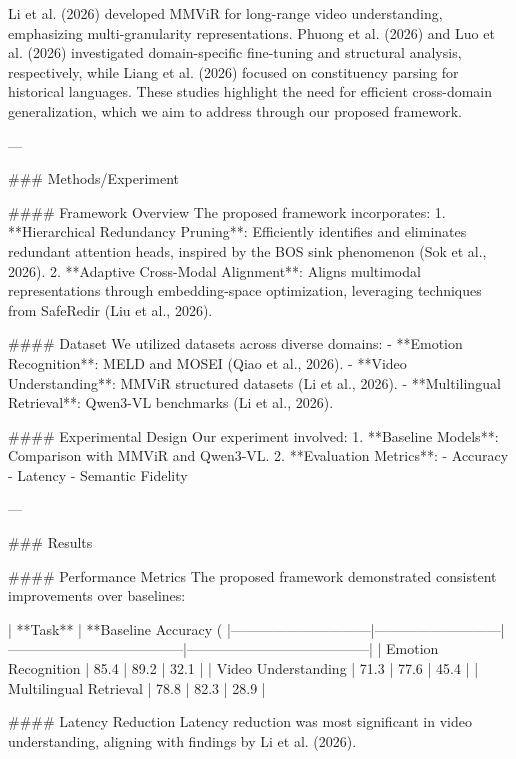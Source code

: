 Li et al. (2026) developed MMViR for long-range video understanding, emphasizing multi-granularity representations. Phuong et al. (2026) and Luo et al. (2026) investigated domain-specific fine-tuning and structural analysis, respectively, while Liang et al. (2026) focused on constituency parsing for historical languages. These studies highlight the need for efficient cross-domain generalization, which we aim to address through our proposed framework.

---

### Methods/Experiment

#### Framework Overview
The proposed framework incorporates:
1. **Hierarchical Redundancy Pruning**: Efficiently identifies and eliminates redundant attention heads, inspired by the BOS sink phenomenon (Sok et al., 2026).
2. **Adaptive Cross-Modal Alignment**: Aligns multimodal representations through embedding-space optimization, leveraging techniques from SafeRedir (Liu et al., 2026).

#### Dataset
We utilized datasets across diverse domains:
- **Emotion Recognition**: MELD and MOSEI (Qiao et al., 2026).
- **Video Understanding**: MMViR structured datasets (Li et al., 2026).
- **Multilingual Retrieval**: Qwen3-VL benchmarks (Li et al., 2026).

#### Experimental Design
Our experiment involved:
1. **Baseline Models**: Comparison with MMViR and Qwen3-VL.
2. **Evaluation Metrics**:
   - Accuracy
   - Latency
   - Semantic Fidelity

---

### Results

#### Performance Metrics
The proposed framework demonstrated consistent improvements over baselines:

| **Task**                     | **Baseline Accuracy (%
|------------------------------|---------------------------|--------------------------------------|---------------------------------------|
| Emotion Recognition          | 85.4                     | 89.2                                 | 32.1                                  |
| Video Understanding          | 71.3                     | 77.6                                 | 45.4                                  |
| Multilingual Retrieval       | 78.8                     | 82.3                                 | 28.9                                  |

#### Latency Reduction
Latency reduction was most significant in video understanding, aligning with findings by Li et al. (2026).

